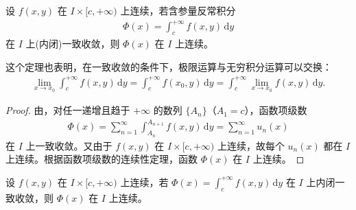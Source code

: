 \documentclass[../../main.tex]{subfiles}%
\begin{document}
\begin{theorem}[含参反常积分的连续性]\label{theorem:含参量反常积分的连续性}
设 \( f(x,y) \) 在 \( I \times [c, +\infty) \) 上连续，若含参量反常积分
\begin{align}\label{12}
\Phi(x) = \int_{c}^{+\infty} f(x,y) \, \mathrm{d}y
\end{align}
在 \( I \) 上(内闭)一致收敛，则 \( \Phi(x) \) 在 \( I \) 上连续。
\end{theorem}
\begin{note}
这个定理也表明，在一致收敛的条件下，极限运算与无穷积分运算可以交换：
\begin{align}\label{eq::::--34802jrw4f3454t}
\lim_{x \to x_0} \int_{c}^{+\infty} f(x,y) \, \mathrm{d}y = \int_{c}^{+\infty} f(x_0,y) \, \mathrm{d}y = \int_{c}^{+\infty} \lim_{x \to x_0} f(x,y) \, \mathrm{d}y.
\end{align}
\end{note}
\begin{proof}

由，对任一递增且趋于 \( +\infty \) 的数列 \( \{A_n\} \)（\( A_1 = c \)），函数项级数
\begin{align}\label{eq::::--34802jrw4f34t}
\Phi(x) = \sum_{n=1}^{\infty} \int_{A_n}^{A_{n+1}} f(x,y) \, \mathrm{d}y = \sum_{n=1}^{\infty} u_n(x)
\end{align}
在 \( I \) 上一致收敛。又由于 \( f(x,y) \) 在 \( I \times [c, +\infty) \) 上连续，故每个 \( u_n(x) \) 都在 \( I \) 上连续。根据函数项级数的连续性定理，函数 \( \Phi(x) \) 在 \( I \) 上连续。

\end{proof}

\begin{corollary}
设 \( f(x,y) \) 在 \( I \times [c, +\infty) \) 上连续，若 \( \Phi(x) = \int_{c}^{+\infty} f(x,y) \, \mathrm{d}y \) 在 \( I \) 上内闭一致收敛，则 \( \Phi(x) \) 在 \( I \) 上连续。
\end{corollary}
\end{document}
